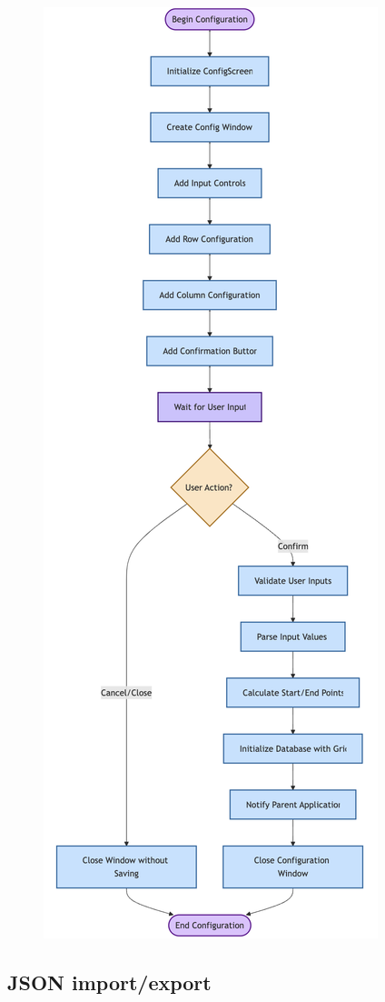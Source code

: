 \begin{figure}[htbp]
    \centering
    \includegraphics[width=0.4\linewidth]{Flowcharts/config1.png}

\end{figure}

\newpage

\subsection{JSON import/export}

